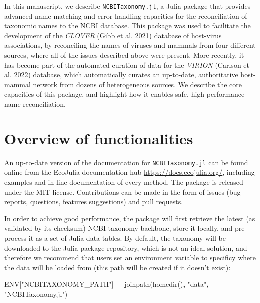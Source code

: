 \documentclass[10pt,oneside]{article}
\newenvironment{Shaded}{\begin{snugshade}}{\end{snugshade}}
\newcommand{\ConstantTok}[1]{\textcolor[rgb]{0.00,0.00,0.00}{#1}}
\newcommand{\StringTok}[1]{\textcolor[rgb]{0.31,0.60,0.02}{#1}}
\newcommand{\OperatorTok}[1]{\textcolor[rgb]{0.81,0.36,0.00}{\textbf{#1}}}
\newcommand{\NormalTok}[1]{#1}
\begin{document}
In this manuscript, we describe \texttt{NCBITaxonomy.jl}, a Julia
package that provides advanced name matching and error handling
capacities for the reconciliation of taxonomic names to the NCBI
database. This package was used to facilitate the development of the
\emph{CLOVER} (Gibb et al. 2021) database of host-virus associations, by
reconciling the names of viruses and mammals from four different
sources, where all of the issues described above were present. More
recently, it has become part of the automated curation of data for the
\emph{VIRION} (Carlson et al. 2022) database, which automatically
curates an up-to-date, authoritative host-mammal network from dozens of
heterogeneous sources. We describe the core capacities of this package,
and highlight how it enables safe, high-performance name reconciliation.

\hypertarget{overview-of-functionalities}{%
\section{Overview of
functionalities}\label{overview-of-functionalities}}

An up-to-date version of the documentation for \texttt{NCBITaxonomy.jl}
can be found online from the EcoJulia documentation hub
\href{https://docs.ecojulia.org/NCBITaxonomy.jl/stable/}{https://docs.ecojulia.org/},
including examples and in-line documentation of every method. The
package is released under the MIT license. Contributions can be made in
the form of issues (bug reports, questions, features suggestions) and
pull requests.

In order to achieve good performance, the package will first retrieve
the latest (as validated by its checksum) NCBI taxonomy backbone, store
it locally, and pre-process it as a set of Julia data tables. By
default, the taxonomy will be downloaded to the Julia package
repository, which is not an ideal solution, and therefore we recommend
that users set an environment variable to specificy where the data will
be loaded from (this path will be created if it doesn't exist):

\begin{Shaded}
\begin{Highlighting}[]
\ConstantTok{ENV}\NormalTok{[}\StringTok{"NCBITAXONOMY\_PATH"}\NormalTok{] }\OperatorTok{=}\NormalTok{ joinpath(homedir()}\OperatorTok{,} \StringTok{"data"}\OperatorTok{,} \StringTok{"NCBITaxonomy.jl"}\NormalTok{)}
\end{Highlighting}
\end{Shaded}
\end{document}

